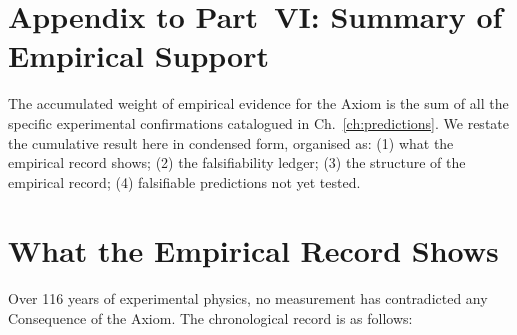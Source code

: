 
\section*{Appendix to Part~VI: Summary of Empirical Support}

The accumulated weight of empirical evidence for the Axiom is the sum of
all the specific experimental confirmations catalogued in
Ch.~\ref{ch:predictions}.  We restate the cumulative result here in
condensed form, organised as: (1) what the empirical record shows;
(2) the falsifiability ledger; (3) the structure of the empirical record;
(4) falsifiable predictions not yet tested.

\section*{What the Empirical Record Shows}

Over 116 years of experimental physics, no measurement has contradicted any
Consequence of the Axiom.  The chronological record is as follows:

